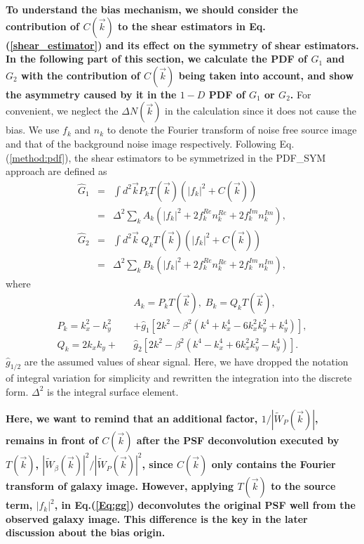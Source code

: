 \documentclass[twocolumn]{aastex62}
\begin{document}
\textbf{To understand the bias mechanism, we should consider the contribution of $C(\vec{k})$ to the shear estimators in Eq.(\ref{shear_estimator}) and its effect on the symmetry of shear estimators. In the following part of this section, we calculate the PDF of $G_1$ and $G_2$ with the contribution of $C(\vec{k})$ being taken into account, and show the asymmetry caused by it in the $1-D$ PDF of $G_1$ or $G_2$.} For convenient, we neglect the $\Delta N(\vec{k})$ in the calculation since it does not cause the bias. We use $f_k$ and $n_k$ to denote the Fourier transform of noise free source image and that of the background noise image respectively. Following Eq.(\ref{method:pdf}), the shear estimators to be symmetrized in the PDF\_SYM approach are defined as
\begin{eqnarray}
\label{Eq:gg}
\hat{G}_1&=&\int{d}^2\vec{k} P_k T(\vec{k})\left(\vert f_k\vert^2 + C(\vec{k})\right) \\ \nonumber
&=&\Delta^2\sum_k A_k \left(\vert f_k\vert^2+2f_k^{Re}n_k^{Re}+2f_k^{Im}n_k^{Im}\right), \\ \nonumber
\hat{G}_2&=&\int{d}^2\vec{k} \; Q_k T(\vec{k})\left(\vert f_k\vert^2 + C(\vec{k})\right)\\ \nonumber
&=&\Delta^2\sum_kB_k\left(\vert f_k\vert^2+2f_k^{Re}n_k^{Re}+2f_k^{Im}n_k^{Im}\right),
\end{eqnarray}
where
\begin{eqnarray}
&&A_k = P_k T(\vec{k}),\; B_k = Q_k T(\vec{k}) ,\\ \nonumber
P_k = k_x^2-k_y^2&& + \hat{g}_1\left[2k^2-\beta^2\left(k^4+k_x^4-6k_x^2k_y^2+k_y^4\right)\right],\\ \nonumber
Q_k = 2k_xk_y+&&\hat{g}_2\left[2k^2-\beta^2\left(k^4-k_x^4+6k_x^2k_y^2-k_y^4\right)\right].
\end{eqnarray}
$\hat{g}_{1/2}$ are the assumed values of shear signal. Here, we have dropped the notation of integral variation for simplicity and rewritten the integration into the discrete form. $\Delta^2$ is the integral surface element. 

\textbf{Here, we want to remind that an additional factor, $1/|\widetilde{W}_{P}(\vec{k})|$, remains in front of $C(\vec{k})$ after the PSF deconvolution executed by $T(\vec{k})$, $|\widetilde{W}_{\beta}(\vec{k})|^2/|\widetilde{W}_{P}(\vec{k})|^2$, since $C(\vec{k})$ only contains the Fourier transform of galaxy image. However, applying $T(\vec{k})$ to the source term, $\vert f_k\vert^2$, in Eq.(\ref{Eq:gg}) deconvolutes the original PSF well from the observed galaxy image. This difference is the key in the later discussion about the bias origin.}
\end{document}
